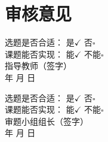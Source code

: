 \documentclass[UTF8,12pt,a4paper]{ctexart}
\begin{document}
\section*{审核意见}
\noindent\begin{minipage}[t]{0.47\textwidth}
选题是否合适： 是\ensuremath{\checkmark}  否\ensuremath{\square}\\[0.5em]
课题能否实现： 能\ensuremath{\checkmark}  不能\ensuremath{\square}\\[0.5em]
指导教师（签字）\\[0.5em]
年    月    日
\end{minipage}\hfill
\begin{minipage}[t]{0.47\textwidth}
选题是否合适： 是\ensuremath{\checkmark}  否\ensuremath{\square}\\[0.5em]
课题能否实现： 能\ensuremath{\checkmark}  不能\ensuremath{\square}\\[0.5em]
审题小组组长（签字）\\[0.5em]
年    月    日
\end{minipage}
\end{document}
